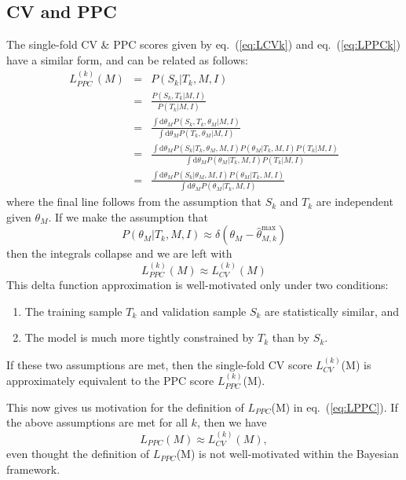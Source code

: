 \documentclass[12pt]{article}
\newcommand{\dd}{\mathrm{d}}
\newcommand{\thetamax}[1]{\ensuremath{\hat{\theta}^{\max}_{#1}}}
\newcommand{\LCVk}[1]{\ensuremath{L^{(k)}_{CV}}(#1)}
\newcommand{\LPPC}[1]{\ensuremath{L_{PPC}}(#1)}
\newcommand{\LPPCk}[1]{\ensuremath{L^{(k)}_{PPC}}(#1)}
\newcommand{\eqn}[1]{eq.~(\ref{eq:#1})}
\begin{document}
\subsection{CV and PPC}
The single-fold CV \& PPC scores given by %
\eqn{LCVk} and \eqn{LPPCk}
have a similar form, and can be related as follows:
\begin{eqnarray}
  \LPPCk{M} &=& P(S_k|T_k,M,I)\\
            &=& \frac{P(S_k,T_k|M,I)}{P(T_k|M,I)}\\
            &=& \frac{\int \dd\theta_M P(S_k,T_k,\theta_M|M,I)}
                     {\int \dd\theta_M P(T_k,\theta_M|M,I)}\\
            &=& \frac{\int \dd\theta_M P(S_k|T_k,\theta_M,M,I)
                                       P(\theta_M|T_k,M,I)P(T_k|M,I)}
                     {\int \dd\theta_M P(\theta_M|T_k,M,I) P(T_k|M,I)}\\
            &=& \frac{\int \dd\theta_M P(S_k|\theta_M,M,I)P(\theta_M|T_k,M,I)}
                     {\int \dd\theta_M P(\theta_M|T_k,M,I)}
\end{eqnarray}
where the final line follows from the assumption that $S_k$ and $T_k$ are
independent given $\theta_M$.  If we make the assumption that
\begin{equation}
  P(\theta_M|T_k,M,I) \approx \delta(\theta_M - \thetamax{M,k})
\end{equation}
then the integrals collapse and we are left with
\begin{equation}
  \LPPCk{M} \approx \LCVk{M}
\end{equation}
This delta function approximation is well-motivated only under two conditions:
\begin{enumerate}
  \item The training sample $T_k$ and validation sample $S_k$ are
    statistically similar, and
  \item The model is much more tightly constrained by $T_k$ than by $S_k$.
\end{enumerate}
If these two assumptions are met, then the single-fold CV score \LCVk{M} is
approximately equivalent to the PPC score \LPPCk{M}.

This now gives us motivation for the definition of \LPPC{M} in \eqn{LPPC}.
If the above assumptions are met for all $k$, then we have
\begin{equation}
  \LPPC{M} \approx \LCVk{M},
\end{equation}
even thought the definition of \LPPC{M} is not well-motivated within the
Bayesian framework.
\end{document}

